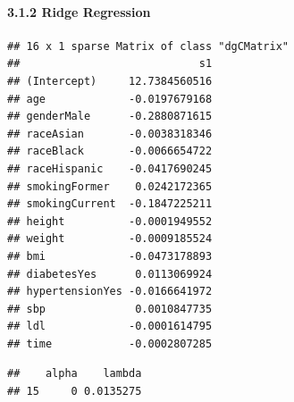 \documentclass[
]{article}
\newenvironment{Shaded}{\begin{snugshade}}{\end{snugshade}}
\newcommand{\AttributeTok}[1]{\textcolor[rgb]{0.13,0.29,0.53}{#1}}
\newcommand{\DecValTok}[1]{\textcolor[rgb]{0.00,0.00,0.81}{#1}}
\newcommand{\FunctionTok}[1]{\textcolor[rgb]{0.13,0.29,0.53}{\textbf{#1}}}
\newcommand{\NormalTok}[1]{#1}
\newcommand{\OtherTok}[1]{\textcolor[rgb]{0.56,0.35,0.01}{#1}}
\newcommand{\SpecialCharTok}[1]{\textcolor[rgb]{0.81,0.36,0.00}{\textbf{#1}}}
\newcommand{\StringTok}[1]{\textcolor[rgb]{0.31,0.60,0.02}{#1}}
\begin{document}
\paragraph{3.1.2 Ridge Regression}\label{ridge-regression}

\begin{Shaded}
\end{Shaded}

\begin{verbatim}
## 16 x 1 sparse Matrix of class "dgCMatrix"
##                            s1
## (Intercept)     12.7384560516
## age             -0.0197679168
## genderMale      -0.2880871615
## raceAsian       -0.0038318346
## raceBlack       -0.0066654722
## raceHispanic    -0.0417690245
## smokingFormer    0.0242172365
## smokingCurrent  -0.1847225211
## height          -0.0001949552
## weight          -0.0009185524
## bmi             -0.0473178893
## diabetesYes      0.0113069924
## hypertensionYes -0.0166641972
## sbp              0.0010847735
## ldl             -0.0001614795
## time            -0.0002807285
\end{verbatim}

\begin{Shaded}
\end{Shaded}

\begin{verbatim}
##    alpha    lambda
## 15     0 0.0135275
\end{verbatim}
\end{document}
